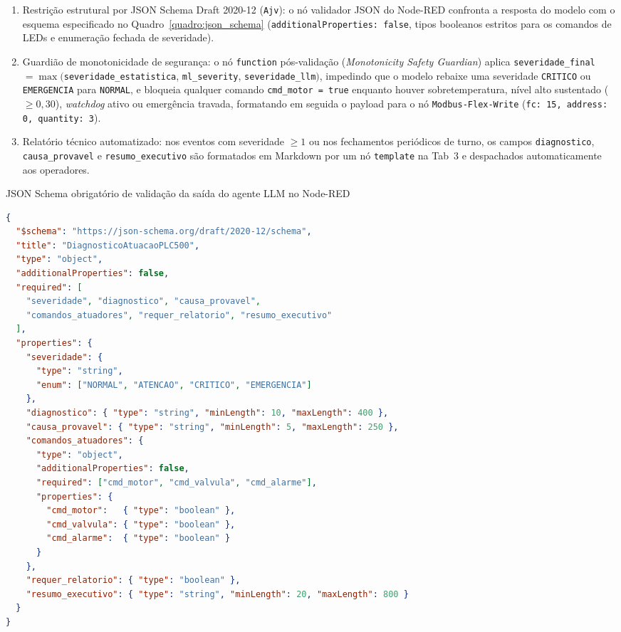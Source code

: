 \begin{enumerate}
  \item Restrição estrutural por JSON Schema Draft 2020-12 (\texttt{Ajv}): o nó validador JSON do Node-RED confronta a resposta do modelo com o esquema especificado no Quadro~\ref{quadro:json_schema} (\texttt{additionalProperties: false}, tipos booleanos estritos para os comandos de LEDs e enumeração fechada de severidade).
  \item Guardião de monotonicidade de segurança: o nó \texttt{function} pós-validação (\textit{Monotonicity Safety Guardian}) aplica \texttt{severidade\_\allowbreak final} $= \max($\texttt{severidade\_\allowbreak estatistica}, \texttt{ml\_\allowbreak severity}, \texttt{severidade\_\allowbreak llm}$)$, impedindo que o modelo rebaixe uma severidade \texttt{CRITICO} ou \texttt{EMERGENCIA} para \texttt{NORMAL}, e bloqueia qualquer comando \texttt{cmd\_motor = true} enquanto houver sobretemperatura, nível alto sustentado ($\ge 0{,}30$), \textit{watchdog} ativo ou emergência travada, formatando em seguida o payload para o nó \texttt{Modbus-Flex-Write} (\texttt{fc: 15, address: 0, quantity: 3}).
  \item Relatório técnico automatizado: nos eventos com severidade $\ge 1$ ou nos fechamentos periódicos de turno, os campos \texttt{diagnostico}, \texttt{causa\_provavel} e \texttt{resumo\_executivo} são formatados em Markdown por um nó \texttt{template} na Tab~3 e despachados automaticamente aos operadores.
\end{enumerate}

\begin{quadro}[htb]
  \centering
  \SingleSpacing
  \caption{JSON Schema obrigatório de validação da saída do agente LLM no Node-RED}
  \label{quadro:json_schema}
  \begin{lstlisting}[language=JSON]
{
  "$schema": "https://json-schema.org/draft/2020-12/schema",
  "title": "DiagnosticoAtuacaoPLC500",
  "type": "object",
  "additionalProperties": false,
  "required": [
    "severidade", "diagnostico", "causa_provavel",
    "comandos_atuadores", "requer_relatorio", "resumo_executivo"
  ],
  "properties": {
    "severidade": {
      "type": "string",
      "enum": ["NORMAL", "ATENCAO", "CRITICO", "EMERGENCIA"]
    },
    "diagnostico": { "type": "string", "minLength": 10, "maxLength": 400 },
    "causa_provavel": { "type": "string", "minLength": 5, "maxLength": 250 },
    "comandos_atuadores": {
      "type": "object",
      "additionalProperties": false,
      "required": ["cmd_motor", "cmd_valvula", "cmd_alarme"],
      "properties": {
        "cmd_motor":   { "type": "boolean" },
        "cmd_valvula": { "type": "boolean" },
        "cmd_alarme":  { "type": "boolean" }
      }
    },
    "requer_relatorio": { "type": "boolean" },
    "resumo_executivo": { "type": "string", "minLength": 20, "maxLength": 800 }
  }
}
  \end{lstlisting}
\end{quadro}

